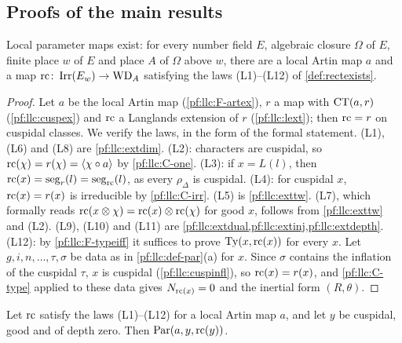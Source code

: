 \subsection{Proofs of the main results}\label{pf:llc:sec-main}

\begin{theorem}\label{pf:llc:main}
Local parameter maps exist: for every number field $E$, algebraic closure $\Omega$ of $E$, finite place $w$ of $E$ and place
$A$ of $\Omega$ above $w$, there are a local Artin map $a$ and a map $\mathrm{rc}\colon\operatorname{Irr}(E_w)\to\mathrm{WD}_A$ satisfying the laws
(L1)--(L12) of \cref{def:rectexists}. 
\end{theorem}

\begin{proof}
Let $a$ be the local Artin map (\ref{pf:llc:F-artex}), $r$ a map with $\operatorname{CT}(a,r)$ (\cref{pf:llc:cuspex}) and $\mathrm{rc}$ a
Langlands extension of $r$ (\cref{pf:llc:lext}); then $\mathrm{rc}=r$ on cuspidal classes. We verify the laws, in the form of
the formal statement. (L1), (L6) and (L8) are \cref{pf:llc:extdim}. (L2): characters
are cuspidal, so $\mathrm{rc}(\chi)=r(\chi)=\langle\chi\circ a\rangle$ by \ref{pf:llc:C-one}. (L3): if $x=L(l)$, then
$\mathrm{rc}(x)=\operatorname{seg}_r(l)=\operatorname{seg}_{\mathrm{rc}}(l)$, as every $\rho_\Delta$ is cuspidal. (L4): for cuspidal $x$, $\mathrm{rc}(x)=r(x)$ is
irreducible by \ref{pf:llc:C-irr}. (L5) is \cref{pf:llc:exttw}. (L7), which formally reads
$\mathrm{rc}(x\otimes\chi)=\mathrm{rc}(x)\otimes\mathrm{rc}(\chi)$ for good $x$, follows from \cref{pf:llc:exttw} and (L2). (L9), (L10) and (L11)
are \cref{pf:llc:extdual,pf:llc:extinj,pf:llc:extdepth}. (L12): by \ref{pf:llc:F-typeiff} it suffices to prove
$\operatorname{Ty}(x,\mathrm{rc}(x))$ for every $x$. Let $g,i,n,\dots,\tau,\sigma$ be data as in \cref{pf:llc:def-par}(a) for $x$. Since $\sigma$
contains the inflation of the cuspidal $\tau$, $x$ is cuspidal (\cref{pf:llc:cuspinfl}), so $\mathrm{rc}(x)=r(x)$, and
\ref{pf:llc:C-type} applied to these data gives $N_{\mathrm{rc}(x)}=0$ and the inertial form $(R,\theta)$.
\end{proof}

\begin{lemma}\label{pf:llc:paroflaws}
Let $\mathrm{rc}$ satisfy the laws (L1)--(L12) for a local Artin map $a$, and let $y$ be cuspidal, good and of depth zero. Then
$\operatorname{Par}(a,y,\mathrm{rc}(y))$. 
\end{lemma}

